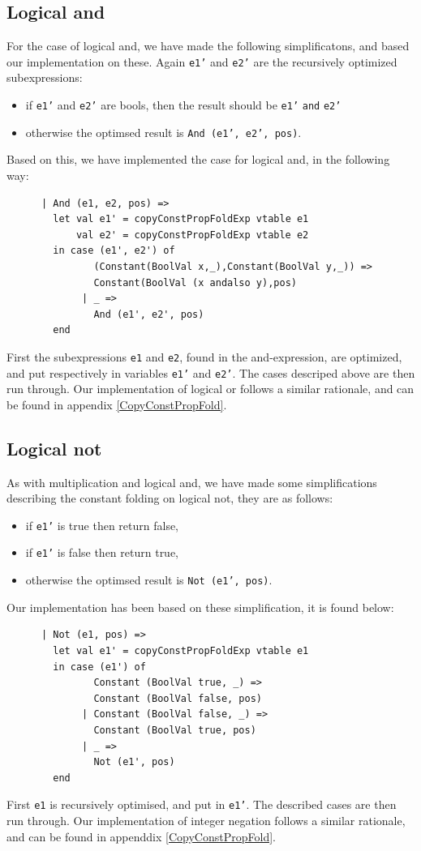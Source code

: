 \documentclass[11pt]{article}
\begin{document}
	\subsection{Logical and}
	For the case of logical and, we have made the following simplificatons, and based our implementation
	on these. Again \texttt{e1'} and \texttt{e2'} are the recursively optimized subexpressions:
	\begin{itemize}
	\item if \texttt{e1'} and \texttt{e2'} are bools, then the result should be
	\texttt{e1'} \texttt{and} \texttt{e2'}
	\item otherwise the optimsed result is  \texttt{And (e1', e2', pos)}.
	\end{itemize}
	Based on this, we have implemented the case for logical and, in the following way:
	\begin{lstlisting}
      | And (e1, e2, pos) =>
        let val e1' = copyConstPropFoldExp vtable e1
            val e2' = copyConstPropFoldExp vtable e2
        in case (e1', e2') of
               (Constant(BoolVal x,_),Constant(BoolVal y,_)) =>
               Constant(BoolVal (x andalso y),pos)
             | _ =>
               And (e1', e2', pos)
        end
	\end{lstlisting}
	First the subexpressions \texttt{e1} and \texttt{e2}, found in the and-expression, are
	optimized, and put respectively in variables \texttt{e1'} and \texttt{e2'}. The cases descriped above
	are then run through. Our implementation of logical or follows a similar rationale, and can be found in
	appendix \ref{CopyConstPropFold}.
	\subsection{Logical not}
	As with multiplication and logical and, we have made some simplifications describing the
	constant folding on logical not, they are as follows:
	\begin{itemize}
	\item if \texttt{e1'} is true then return false,
	\item if \texttt{e1'} is false then return true,
	\item otherwise the optimsed result is  \texttt{Not (e1', pos)}.
	\end{itemize}
	Our implementation has been based on these simplification, it is found below:
	\begin{lstlisting}
      | Not (e1, pos) =>
        let val e1' = copyConstPropFoldExp vtable e1
        in case (e1') of
               Constant (BoolVal true, _) =>
               Constant (BoolVal false, pos)
             | Constant (BoolVal false, _) =>
               Constant (BoolVal true, pos)
             | _ =>
               Not (e1', pos)
        end
	\end{lstlisting}
	First \texttt{e1} is recursively optimised, and put in \texttt{e1'}. The described cases are
	then run through. Our implementation of integer negation follows a similar rationale, and can
	be found in appenddix \ref{CopyConstPropFold}.
\end{document}
